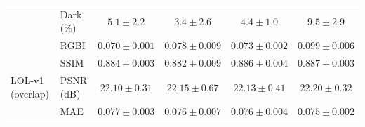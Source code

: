 \begin{table}[t]
{\begin{tabular}{llcccc}
			& Dark (\%) & $5.1 \pm 2.2$ & $\mathbf{3.4 \pm 2.6}$ & $4.4 \pm 1.0$ & $9.5 \pm 2.9$ \\
			& RGBI & $\mathbf{0.070 \pm 0.001}$ & $0.078 \pm 0.009$ & $0.073 \pm 0.002$ & $0.099 \pm 0.006$ \\
			\midrule
			\multirow{3}{*}{LOL-v1 (overlap)}
			& SSIM & $0.884 \pm 0.003$ & $0.882 \pm 0.009$ & $0.886 \pm 0.004$ & $\mathbf{0.887 \pm 0.003}$ \\
			& PSNR (dB) & $22.10 \pm 0.31$ & $22.15 \pm 0.67$ & $22.13 \pm 0.41$ & $\mathbf{22.20 \pm 0.32}$ \\
			& MAE & $0.077 \pm 0.003$ & $0.076 \pm 0.007$ & $0.076 \pm 0.004$ & $\mathbf{0.075 \pm 0.002}$ \\
			\bottomrule
		\end{tabular}
	}
\end{table}